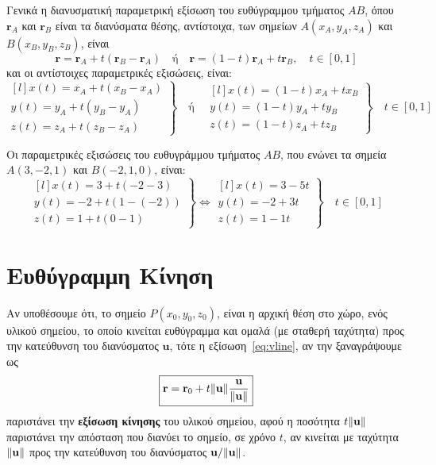 Γενικά η διανυσματική παραμετρική εξίσωση του \textcolor{Col1}{ευθύγραμμου τμήματος} 
$ AB $, όπου $ \mathbf{r}_{A} $ και $ \mathbf{r}_{B} $ είναι τα διανύσματα θέσης, 
αντίστοιχα, των σημείων $ A(x_{A},y_{A},z_{A}) $ και $B(x_{B},y_{B},z_{B})$, είναι 
\[
  \boxed{\mathbf{r} = \mathbf{r}_{A} + t(\mathbf{r}_{B}- \mathbf{r}_{A})} 
  \quad \text{ή} \quad \boxed{\mathbf{r} = (1-t) \mathbf{r}_{A} + t \mathbf{r}_{B}}, 
  \quad t \in [0,1]
\] 
και οι αντίστοιχες παραμετρικές εξισώσεις, είναι:
\[
  \boxed{\left.
      \begin{matrix*}[l]
        x(t) = x_{A} + t(x_{B}-x_{A}) \\
        y(t) = y_{A} + t(y_{B}-y_{A}) \\
        z(t) = z_{A} + t(z_{B}-z_{A}) 
      \end{matrix*} 
  \right\}} \quad \text{ή} \quad  
  \boxed{\left.
      \begin{matrix*}[l]
        x(t) = (1-t)x_{A} + tx_{B} \\
        y(t) = (1-t)y_{A} + ty_{B} \\
        z(t) = (1-t)z_{A} + tz_{B} 
      \end{matrix*} 
  \right\}} \quad t \in [0,1]
\]

\begin{example}
  Οι παραμετρικές εξισώσεις του ευθυγράμμου τμήματος $ AB $, που ενώνει τα σημεία 
  $ A(3,-2,1) $ και $ B(-2,1,0) $, είναι:
  \[
    \left.
      \begin{matrix*}[l]
        x(t) = 3+t(-2-3) \\
        y(t) = -2+t(1-(-2)) \\
        z(t) = 1+t(0-1)
      \end{matrix*} 
    \right\} \Leftrightarrow 
    \left.
      \begin{matrix*}[l]
        x(t) = 3-5t \\
        y(t) = -2+3t \\
        z(t) = 1-1t
      \end{matrix*} 
    \right\} \quad t \in [0,1]
  \] 
\end{example}


\section*{Ευθύγραμμη Κίνηση}

Αν υποθέσουμε ότι, το σημείο $ P(x_{0}, y_{0}, z_{0}) $, είναι η αρχική θέση στο 
χώρο, ενός υλικού σημείου, το οποίο κινείται ευθύγραμμα και ομαλά (με σταθερή ταχύτητα) 
προς την κατεύθυνση του διανύσματος $ \mathbf{u} $, τότε η εξίσωση~\eqref{eq:vline}, 
αν την ξαναγράψουμε ως
\[
  \boxed{\mathbf{r} = \mathbf{r}_{0} + t \norm{\mathbf{u}}
  \frac{\mathbf{u}}{\norm{\mathbf{u}}}}
\]
παριστάνει την \textbf{εξίσωση κίνησης} του υλικού σημείου, αφού η ποσότητα 
$ t \norm{\mathbf{u}} $ παριστάνει την απόσταση που διανύει το σημείο, σε χρόνο $t$, 
αν κινείται με ταχύτητα $ \norm{\mathbf{u}} $ προς την κατεύθυνση του διανύσματος 
$ \mathbf{u}/ \norm{\mathbf{u}} $.


